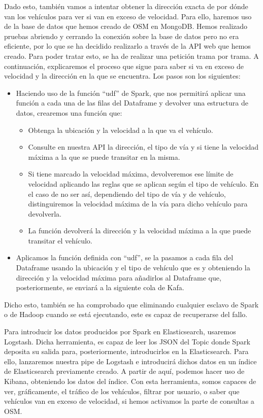 Dado esto, también vamos a intentar obtener la dirección exacta de por dónde van los vehículos para ver si van en exceso de velocidad. Para ello, haremos uso de la base de datos que hemos creado de OSM en MongoDB. Hemos realizado pruebas abriendo y cerrando la conexión sobre la base de datos pero no era eficiente, por lo que se ha decidido realizarlo a través de la API web que hemos creado. Para poder tratar esto, se ha de realizar una petición trama por trama. A continuación, explicaremos el proceso que sigue para saber si va en exceso de velocidad y la dirección en la que se encuentra. Los pasos son los siguientes:

\begin{itemize}
        \item Haciendo uso de la función “udf” de Spark, que nos permitirá aplicar una función a cada una de las filas del Dataframe y devolver una estructura de datos, crearemos una función que:
        \begin{itemize}
                \item Obtenga la ubicación y la velocidad a la que va el vehículo.
                \item Consulte en nuestra API la dirección, el tipo de vía y si tiene la velocidad máxima a la que se puede transitar en la misma.
                \item Si tiene marcado la velocidad máxima, devolveremos ese límite de velocidad aplicando las reglas que se aplican según el tipo de vehículo. En el caso de no ser así, dependiendo del tipo de vía y de vehículo, distinguiremos la velocidad máxima de la vía para dicho vehículo para devolverla.
                \item La función devolverá la dirección y la velocidad máxima a la que puede transitar el vehículo.
        \end{itemize}
        \item Aplicamos la función definida con “udf”, se la pasamos a cada fila del Dataframe usando la ubicación y el tipo de vehículo que es y obteniendo la dirección y la velocidad máxima para añadirlos al Dataframe que, posteriormente, se enviará a la siguiente cola de Kafa.
\end{itemize}
Dicho esto, también se ha comprobado que eliminando cualquier esclavo de Spark o de Hadoop cuando se está ejecutando, este es capaz de recuperarse del fallo.

Para introducir los datos producidos por Spark en Elasticsearch, usaremos Logstash. Dicha herramienta, es capaz de leer los JSON del Topic donde Spark deposita su salida para, posteriormente, introducirlos en la Elasticsearch. Para ello, lanzaremos nuestra pipe de Logstash e introducirá dichos datos en un índice de Elasticsearch previamente creado. A partir de aquí, podemos hacer uso de Kibana, obteniendo los datos del índice. Con esta herramienta, somos capaces de ver, gráficamente, el tráfico de los vehículos, filtrar por usuario, o saber que vehículos van en exceso de velocidad, si hemos activamos la parte de consultas a OSM.


